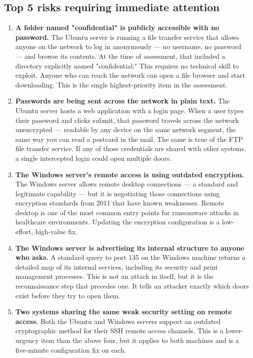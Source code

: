 \documentclass[12pt]{article}
\begin{document}
\subsection{Top 5 risks requiring immediate attention}
\begin{enumerate}
	\item \textbf{A folder named "confidential" is publicly accessible with no password.} The Ubuntu server is running a file transfer service that allows anyone on the network to log in anonymously — no username, no password — and browse its contents. At the time of assessment, that included a directory explicitly named "confidential." This requires no technical skill to exploit. Anyone who can reach the network can open a file browser and start downloading. This is the single highest-priority item in the assessment.
	\item \textbf{Passwords are being sent across the network in plain text.} The Ubuntu server hosts a web application with a login page. When a user types their password and clicks submit, that password travels across the network unencrypted — readable by any device on the same network segment, the same way you can read a postcard in the mail. The same is true of the FTP file transfer service. If any of those credentials are shared with other systems, a single intercepted login could open multiple doors.
	\item \textbf{The Windows server's remote access is using outdated encryption.} The Windows server allows remote desktop connections — a standard and legitimate capability — but it is negotiating those connections using encryption standards from 2011 that have known weaknesses. Remote desktop is one of the most common entry points for ransomware attacks in healthcare environments. Updating the encryption configuration is a low-effort, high-value fix.
	\item \textbf{The Windows server is advertising its internal structure to anyone who asks.} A standard query to port 135 on the Windows machine returns a detailed map of its internal services, including its security and print management processes. This is not an attack in itself, but it is the reconnaissance step that precedes one. It tells an attacker exactly which doors exist before they try to open them.
	\item \textbf{Two systems sharing the same weak security setting on remote access.} Both the Ubuntu and Windows servers support an outdated cryptographic method for their SSH remote access channels. This is a lower-urgency item than the above four, but it applies to both machines and is a five-minute configuration fix on each.
\end{enumerate}
\end{document}

